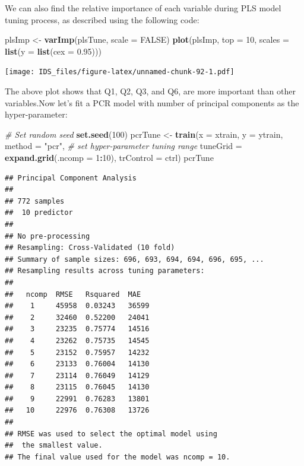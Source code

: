 \documentclass[12pt,]{krantz}
\makeatletter
\newenvironment{Shaded}{\begin{snugshade}}{\end{snugshade}}
\newcommand{\CommentTok}[1]{\textcolor[rgb]{0.37,0.37,0.37}{\textit{#1}}}
\newcommand{\DataTypeTok}[1]{\textcolor[rgb]{0.27,0.27,0.27}{#1}}
\newcommand{\DecValTok}[1]{\textcolor[rgb]{0.06,0.06,0.06}{#1}}
\newcommand{\FloatTok}[1]{\textcolor[rgb]{0.06,0.06,0.06}{#1}}
\newcommand{\KeywordTok}[1]{\textcolor[rgb]{0.27,0.27,0.27}{\textbf{#1}}}
\newcommand{\NormalTok}[1]{#1}
\newcommand{\OperatorTok}[1]{\textcolor[rgb]{0.43,0.43,0.43}{\textbf{#1}}}
\newcommand{\OtherTok}[1]{\textcolor[rgb]{0.37,0.37,0.37}{#1}}
\newcommand{\StringTok}[1]{\textcolor[rgb]{0.5,0.5,0.5}{#1}}
\newenvironment{kframe}{%
\medskip{}
\setlength{\fboxsep}{.8em}
 \def\at@end@of@kframe{}%
 \ifinner\ifhmode%
  \def\at@end@of@kframe{\end{minipage}}%
  \begin{minipage}{\columnwidth}%
 \fi\fi%
 \def\FrameCommand##1{\hskip\@totalleftmargin \hskip-\fboxsep
 \colorbox{shadecolor}{##1}\hskip-\fboxsep
     \hskip-\linewidth \hskip-\@totalleftmargin \hskip\columnwidth}%
 \MakeFramed {\advance\hsize-\width
   \@totalleftmargin\z@ \linewidth\hsize
   \@setminipage}}%
 {\par\unskip\endMakeFramed%
 \at@end@of@kframe}
\renewenvironment{Shaded}{\begin{kframe}}{\end{kframe}}
\makeatother
\begin{document}
We can also find the relative importance of each variable during PLS model tuning process, as described using the following code: 

\begin{Shaded}
\begin{Highlighting}[]
\NormalTok{plsImp <-}\StringTok{ }\KeywordTok{varImp}\NormalTok{(plsTune, }\DataTypeTok{scale =} \OtherTok{FALSE}\NormalTok{)}
\KeywordTok{plot}\NormalTok{(plsImp, }\DataTypeTok{top =} \DecValTok{10}\NormalTok{, }\DataTypeTok{scales =} \KeywordTok{list}\NormalTok{(}\DataTypeTok{y =} \KeywordTok{list}\NormalTok{(}\DataTypeTok{cex =} \FloatTok{0.95}\NormalTok{)))}
\end{Highlighting}
\end{Shaded}

\texttt{[image: IDS\_files/figure-latex/unnamed-chunk-92-1.pdf]}

The above plot shows that Q1, Q2, Q3, and Q6, are more important than other variables.Now let's fit a PCR model with number of principal components as the hyper-parameter: 

\begin{Shaded}
\begin{Highlighting}[]
\CommentTok{# Set random seed}
 \KeywordTok{set.seed}\NormalTok{(}\DecValTok{100}\NormalTok{)}
\NormalTok{ pcrTune <-}\StringTok{ }\KeywordTok{train}\NormalTok{(}\DataTypeTok{x =}\NormalTok{ xtrain, }\DataTypeTok{y =}\NormalTok{ ytrain,}
          \DataTypeTok{method =} \StringTok{"pcr"}\NormalTok{,}
          \CommentTok{# set hyper-parameter tuning range}
          \DataTypeTok{tuneGrid =} \KeywordTok{expand.grid}\NormalTok{(}\DataTypeTok{.ncomp =} \DecValTok{1}\OperatorTok{:}\DecValTok{10}\NormalTok{),}
          \DataTypeTok{trControl =}\NormalTok{ ctrl)}
\NormalTok{ pcrTune}
\end{Highlighting}
\end{Shaded}

\begin{verbatim}
## Principal Component Analysis 
## 
## 772 samples
##  10 predictor
## 
## No pre-processing
## Resampling: Cross-Validated (10 fold) 
## Summary of sample sizes: 696, 693, 694, 694, 696, 695, ... 
## Resampling results across tuning parameters:
## 
##   ncomp  RMSE   Rsquared  MAE  
##    1     45958  0.03243   36599
##    2     32460  0.52200   24041
##    3     23235  0.75774   14516
##    4     23262  0.75735   14545
##    5     23152  0.75957   14232
##    6     23133  0.76004   14130
##    7     23114  0.76049   14129
##    8     23115  0.76045   14130
##    9     22991  0.76283   13801
##   10     22976  0.76308   13726
## 
## RMSE was used to select the optimal model using
##  the smallest value.
## The final value used for the model was ncomp = 10.
\end{verbatim}
\end{document}
